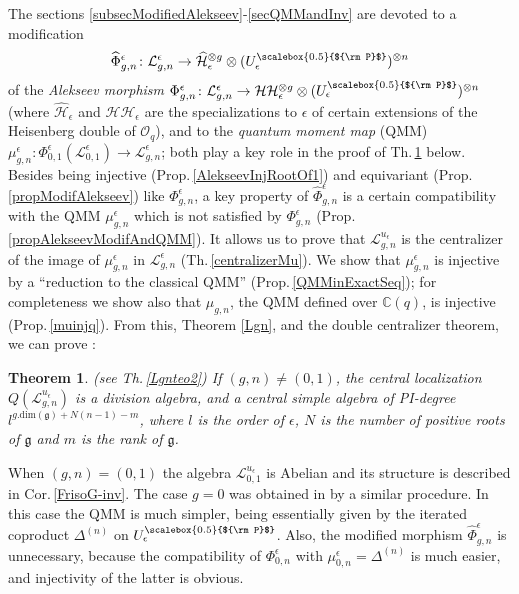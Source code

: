 \documentclass[11pt]{amsart}
\newtheorem{teo}{Theorem}[section]
\newcommand{\e}{\epsilon}
\newcommand{\mc}{\mathbb{C}}
\newcommand{\Ll}{\mathcal{L}}
\newcommand{\Oo}{\mathcal{O}}
\newcommand{\Pup}{{\scalebox{0.5}{${\rm P}$}}}
\begin{document}
The sections \ref{subsecModifiedAlekseev}-\ref{secQMMandInv} are devoted to a modification $$\widehat{\Phi}_{g,n}^\e\colon \Ll_{g,n}^\e \to \widehat{\mathcal{H}}^{\otimes g}_\e \otimes (U_\e^\Pup)^{\otimes n}$$ of the {\em Alekseev morphism} $\Phi_{g,n}^\e\colon \Ll_{g,n}^\e \to \mathcal{H}\mathcal{H}^{\otimes g}_\e \otimes (U_\e^\Pup)^{\otimes n}$ (where $\widehat{\mathcal{H}}_\e$ and $\mathcal{H}\mathcal{H}_\e$ are the specializations to $\e$ of certain extensions of the Heisenberg double of $\Oo_q$), and to the {\em quantum moment map} (QMM) $\mu_{g,n}^\e\colon \Phi_{0,1}^\e(\Ll_{0,1}^\e) \to \Ll_{g,n}^\e$; both play a key role in the proof of Th.\,\ref{Lgn2} below. Besides being injective (Prop.\,\ref{AlekseevInjRootOf1}) and equivariant (Prop.\,\ref{propModifAlekseev}) like $\Phi_{g,n}^\e$, a key property of $\widehat{\Phi}_{g,n}^\e$ is a certain compatibility with the QMM $\mu_{g,n}^\e$ which is not satisfied by $\Phi_{g,n}^\e$ (Prop.\,\ref{propAlekseevModifAndQMM}). It allows us to prove that $\mathcal{L}_{g,n}^{u_\e}$ is the centralizer of the image of $\mu_{g,n}^{\e}$ in $\mathcal{L}_{g,n}^{\e}$ (Th.\,\ref{centralizerMu}). We show that $\mu_{g,n}^\e$ is injective by a ``reduction to the classical QMM'' (Prop.\,\ref{QMMinExactSeq}); for completeness we show also that $\mu_{g,n}$, the QMM defined over $\mc(q)$, is injective (Prop.\,\ref{muinjq}). From this, Theorem \ref{Lgn}, and the double centralizer theorem, we can prove :

\begin{teo}\label{Lgn2} {\rm (see Th.\,\ref{Lgnteo2})} If $(g,n) \neq (0,1)$, the central localization $Q(\Ll_{g,n}^{u_\e})$ is a division algebra, and a central simple algebra of PI-degree $l^{g.\mathrm{dim}(\mathfrak{g})+N(n-1)-m}$, where $l$ is the order of $\e$, $N$ is the number of positive roots of $\mathfrak{g}$ and $m$ is the rank of $\mathfrak{g}$.
\end{teo}
When $(g,n) = (0,1)$ the algebra $\Ll_{0,1}^{u_\e}$ is Abelian and its structure is described in Cor.\,\ref{FrisoG-inv}. The case $g=0$ was obtained in \cite[Theorem 5.4]{BR2} by a similar procedure. In this case the QMM is much simpler, being essentially given by the iterated coproduct $\Delta^{(n)}$ on $U_\e^\Pup$. Also, the modified morphism $\widehat{\Phi}_{g,n}^\e$ is unnecessary, because the compatibility of $\Phi_{0,n}^\e$ with $\mu_{0,n}^{\e}=\Delta^{(n)}$ is much easier, and injectivity of the latter is obvious.
\end{document}

